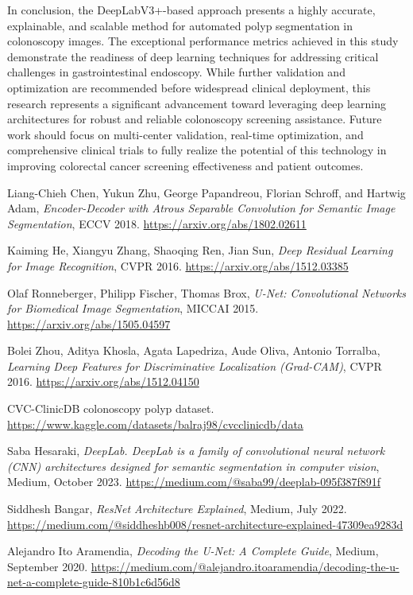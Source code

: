 \documentclass[a4paper,12pt]{report}
\begin{document}
In conclusion, the DeepLabV3+-based approach presents a highly accurate, explainable, and scalable method for automated polyp segmentation in colonoscopy images. The exceptional performance metrics achieved in this study demonstrate the readiness of deep learning techniques for addressing critical challenges in gastrointestinal endoscopy. While further validation and optimization are recommended before widespread clinical deployment, this research represents a significant advancement toward leveraging deep learning architectures for robust and reliable colonoscopy screening assistance. Future work should focus on multi-center validation, real-time optimization, and comprehensive clinical trials to fully realize the potential of this technology in improving colorectal cancer screening effectiveness and patient outcomes.


\begin{thebibliography}{99}

Liang-Chieh Chen, Yukun Zhu, George Papandreou, Florian Schroff, and Hartwig Adam,
\textit{Encoder-Decoder with Atrous Separable Convolution for Semantic Image Segmentation}, ECCV 2018.
\url{https://arxiv.org/abs/1802.02611}

Kaiming He, Xiangyu Zhang, Shaoqing Ren, Jian Sun,
\textit{Deep Residual Learning for Image Recognition}, CVPR 2016.
\url{https://arxiv.org/abs/1512.03385}

Olaf Ronneberger, Philipp Fischer, Thomas Brox,
\textit{U-Net: Convolutional Networks for Biomedical Image Segmentation}, MICCAI 2015.
\url{https://arxiv.org/abs/1505.04597}

Bolei Zhou, Aditya Khosla, Agata Lapedriza, Aude Oliva, Antonio Torralba,
\textit{Learning Deep Features for Discriminative Localization (Grad-CAM)}, CVPR 2016.
\url{https://arxiv.org/abs/1512.04150}

CVC-ClinicDB colonoscopy polyp dataset.
\url{https://www.kaggle.com/datasets/balraj98/cvcclinicdb/data}

Saba Hesaraki,
\textit{DeepLab. DeepLab is a family of convolutional neural network (CNN) architectures designed for semantic segmentation in computer vision},
Medium, October 2023.
\url{https://medium.com/@saba99/deeplab-095f387f891f}

Siddhesh Bangar,
\textit{ResNet Architecture Explained},
Medium, July 2022.
\url{https://medium.com/@siddheshb008/resnet-architecture-explained-47309ea9283d}

Alejandro Ito Aramendia,
\textit{Decoding the U-Net: A Complete Guide},
Medium, September 2020.
\url{https://medium.com/@alejandro.itoaramendia/decoding-the-u-net-a-complete-guide-810b1c6d56d8}

\end{thebibliography}
\end{document}
